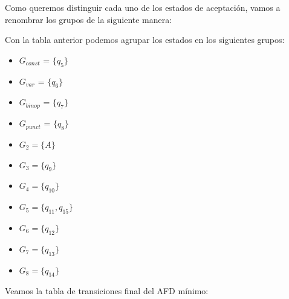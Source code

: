 Como queremos distinguir cada uno de los estados de aceptación, vamos a renombrar los grupos de la siguiente manera:



Con la tabla anterior podemos agrupar los estados en los siguientes grupos:
\begin{itemize}
    \item $G_{const}$ =  $\{q_5\}$
    \item $G_{var}$ =  $\{q_6\}$
    \item $G_{binop}$ =  $\{q_7\}$
    \item $G_{punct}$ =  $\{q_8\}$
    \item $G_2 = \{A\}$
    \item $G_3 = \{q_9\}$
    \item $G_4 = \{q_{10}\}$
    \item $G_5 = \{q_{11},q_{15}\}$
    \item $G_6 = \{q_{12}\}$
    \item $G_7 = \{q_{13}\}$
    \item $G_8 = \{q_{14}\}$
\end{itemize}

Veamos la tabla de transiciones final del AFD mínimo:

